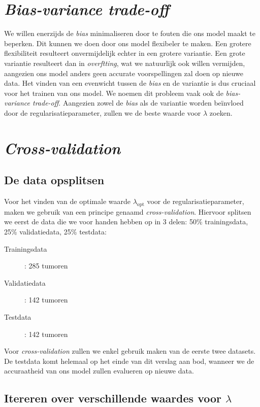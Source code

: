 \documentclass[twoside, kulak]{kulakreport}
\begin{document}
	\section{\textit{Bias-variance trade-off}}
	
	We willen enerzijds de \textit{bias} minimaliseren door te fouten die ons model maakt te beperken. Dit kunnen we doen door ons model flexibeler te maken. Een grotere flexibiliteit resulteert onvermijdelijk echter in een grotere variantie. Een grote variantie resulteert dan in \textit{overftting}, wat we natuurlijk ook willen vermijden, aangezien ons model anders geen accurate voorspellingen zal doen op nieuwe data. Het vinden van een evenwicht tussen de \textit{bias} en de variantie is dus cruciaal voor het trainen van ons model. We noemen dit probleem vaak ook de \textit{bias-variance trade-off}. Aangezien zowel de \textit{bias} als de variantie worden beïnvloed door de regularisatieparameter, zullen we de beste waarde voor \(\lambda\) zoeken.
	
	\section{\textit{Cross-validation}}
	
	\subsection{De data opsplitsen}
	
	Voor het vinden van de optimale waarde \(\lambda_{\text{opt}}\) voor de regularisatieparameter, maken we gebruik van een principe genaamd \textit{cross-validation}. Hiervoor splitsen we eerst de data die we voor handen hebben op in 3 delen: 50\% trainingsdata, 25\% validatiedata, 25\% testdata:
	
	\begin{description}
		\item [Trainingsdata]: 285 tumoren
		\item [Validatiedata]: 142 tumoren
		\item [Testdata]: 142 tumoren
	\end{description}
	
	Voor \textit{cross-validation} zullen we enkel gebruik maken van de eerste twee datasets. De testdata komt helemaal op het einde van dit verslag aan bod, wanneer we de accuraatheid van ons model zullen evalueren op nieuwe data.
	
	\subsection{Itereren over verschillende waardes voor \(\lambda\)}
	
\end{document}
